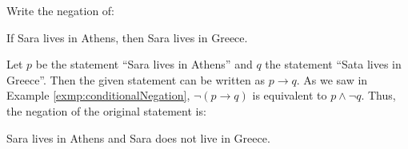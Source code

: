 \guard





\begin{exmp}
\label{exmp:conditionalStatementNegationTranslation}
  Write the negation of:
  \begin{center}
    If Sara lives in Athens, then Sara lives in Greece.
  \end{center}

  Let $p$ be the statement ``Sara lives in Athens'' and $q$ the statement ``Sata lives in Greece''.
  Then the given statement can be written as $p \rightarrow q$.
  As we saw in Example \ref{exmp:conditionalNegation}, $\neg(p\rightarrow q)$ is equivalent to $p\wedge\neg q$.
  Thus, the negation of the original statement is:
  \begin{center}
    Sara lives in Athens and Sara does not live in Greece.
  \end{center}
\end{exmp}
